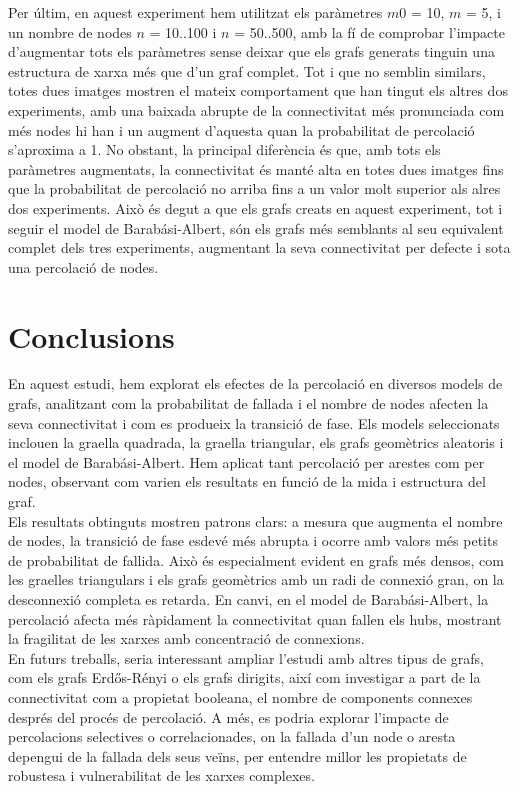 \documentclass[a4paper]{article}
\begin{document}
	Per últim, en aquest experiment hem utilitzat els paràmetres $m0$ = 10, $m$ = 5, i un nombre de nodes $n$ = 10..100 i $n$ = 50..500, amb la fí de comprobar l'impacte d'augmentar tots els paràmetres sense deixar que els grafs generats tinguin una estructura de xarxa més que d'un graf complet. Tot i que no semblin similars, totes dues imatges mostren el mateix comportament que han tingut els altres dos experiments, amb una baixada abrupte de la connectivitat més pronunciada com més nodes hi han i un augment d'aquesta quan la probabilitat de percolació s'aproxima a 1.
	No obstant, la principal diferència és que, amb tots els paràmetres augmentats, la connectivitat és manté alta en totes dues imatges fins que la probabilitat de percolació no arriba fins a un valor molt superior als alres dos experiments. Això és degut a que els grafs creats en aquest experiment, tot i seguir el model de Barabási-Albert, són els grafs més semblants al seu equivalent complet dels tres experiments, augmentant la seva connectivitat per defecte i sota una percolació de nodes.  

	\newpage	
	\section{Conclusions}
	
	En aquest estudi, hem explorat els efectes de la percolació en diversos models de grafs, analitzant com la probabilitat de fallada i el nombre de nodes afecten la seva connectivitat i com es produeix la transició de fase. Els models seleccionats inclouen la graella quadrada, la graella triangular, els grafs geomètrics aleatoris i el model de Barabási-Albert. Hem aplicat tant percolació per arestes com per nodes, observant com varien els resultats en funció de la mida i estructura del graf. \\
	
	Els resultats obtinguts mostren patrons clars: a mesura que augmenta el nombre de nodes, la transició de fase esdevé més abrupta i ocorre amb valors més petits de probabilitat de fallida. Això és especialment evident en grafs més densos, com les graelles triangulars i els grafs geomètrics amb un radi de connexió gran, on la desconnexió completa es retarda. En canvi, en el model de Barabási-Albert, la percolació afecta més ràpidament la connectivitat quan fallen els hubs, mostrant la fragilitat de les xarxes amb concentració de connexions. \\
	
	En futurs treballs, seria interessant ampliar l'estudi amb altres tipus de grafs, com els grafs Erdős-Rényi o els grafs dirigits, així com investigar a part de la connectivitat com a propietat booleana, el nombre de components connexes després del procés de percolació. A més, es podria explorar l'impacte de percolacions selectives o correlacionades, on la fallada d'un node o aresta depengui de la fallada dels seus veïns, per entendre millor les propietats de robustesa i vulnerabilitat de les xarxes complexes.
	
\end{document}
